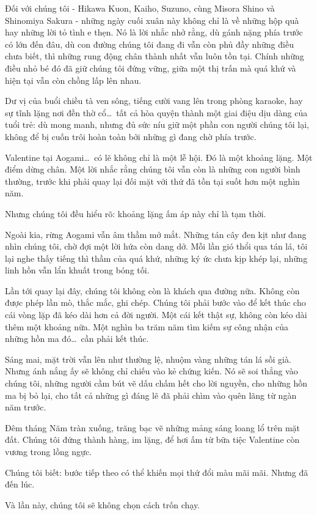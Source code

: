 \documentclass[../main.tex]{subfiles}
\begin{document}
Đối với chúng tôi - Hikawa Kuon, Kaiho, Suzuno, cùng Misora Shino và Shinomiya Sakura - những ngày cuối xuân này không chỉ là về những hộp quà hay những lời tỏ tình e thẹn. Nó là lời nhắc nhở rằng, dù gánh nặng phía trước có lớn đến đâu, dù con đường chúng tôi đang đi vẫn còn phủ đầy những điều chưa biết, thì những rung động chân thành nhất vẫn luôn tồn tại. Chính những điều nhỏ bé đó đã giữ chúng tôi đứng vững, giữa một thị trấn mà quá khứ và hiện tại vẫn còn chồng lấp lên nhau.

Dư vị của buổi chiều tà ven sông, tiếng cười vang lên trong phòng karaoke, hay sự tĩnh lặng nơi đền thờ cổ\dots\ tất cả hòa quyện thành một giai điệu dịu dàng của tuổi trẻ: dù mong manh, nhưng đủ sức níu giữ một phần con người chúng tôi lại, không để bị cuốn trôi hoàn toàn bởi những gì đang chờ phía trước.

Valentine tại Aogami\dots\ có lẽ không chỉ là một lễ hội. Đó là một khoảng lặng. Một điểm dừng chân. Một lời nhắc rằng chúng tôi vẫn còn là những con người bình thường, trước khi phải quay lại đối mặt với thứ đã tồn tại suốt hơn một nghìn năm.

Nhưng chúng tôi đều hiểu rõ: khoảng lặng ấm áp này chỉ là tạm thời.

Ngoài kia, rừng Aogami vẫn âm thầm mở mắt. Những tán cây đen kịt như đang nhìn chúng tôi, chờ đợi một lời hứa còn dang dở. Mỗi lần gió thổi qua tán lá, tôi lại nghe thấy tiếng thì thầm của quá khứ, những ký ức chưa kịp khép lại, những linh hồn vẫn lẩn khuất trong bóng tối.

Lần tới quay lại đây, chúng tôi không còn là khách qua đường nữa. Không còn được phép lần mò, thắc mắc, ghi chép. Chúng tôi phải bước vào để kết thúc cho cái vòng lặp đã kéo dài hơn cả đời người. Một cái kết thật sự, không còn kéo dài thêm một khoảng nữa. Một nghìn ba trăm năm tìm kiếm sự công nhận của những hồn ma đó\dots\ cần phải kết thúc.

Sáng mai, mặt trời vẫn lên như thường lệ, nhuộm vàng những tán lá sồi già. Nhưng ánh nắng ấy sẽ không chỉ chiếu vào kẻ chứng kiến. Nó sẽ soi thẳng vào chúng tôi, những người cầm bút vẽ dấu chấm hết cho lời nguyền, cho những hồn ma bị bỏ lại, cho tất cả những gì đáng lẽ đã phải chìm vào quên lãng từ ngàn năm trước.

Đêm tháng Năm tràn xuống, trăng bạc vẽ những mảng sáng loang lổ trên mặt đất. Chúng tôi đứng thành hàng, im lặng, để hơi ấm từ bữa tiệc Valentine còn vương trong lồng ngực.

Chúng tôi biết: bước tiếp theo có thể khiến mọi thứ đổi màu mãi mãi. Nhưng đã đến lúc.

Và lần này, chúng tôi sẽ không chọn cách trốn chạy.
\end{document}
